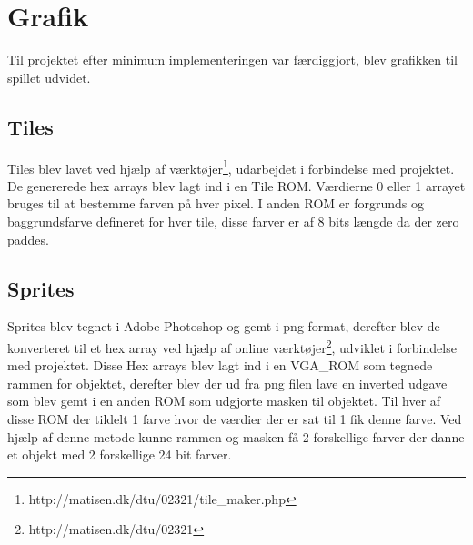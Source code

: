 \section{Grafik}
Til projektet efter minimum implementeringen var færdiggjort, blev grafikken til spillet udvidet. 


\subsection{Tiles}
Tiles blev lavet ved hjælp af værktøjer\footnote{http://matisen.dk/dtu/02321/tile\_maker.php}, udarbejdet i forbindelse med projektet. De genererede hex arrays blev lagt ind i en Tile ROM. Værdierne 0 eller 1 arrayet bruges til at bestemme farven på hver pixel. I anden ROM er forgrunds og baggrundsfarve defineret for hver tile, disse farver er af 8 bits længde da der zero paddes.

\subsection{Sprites}
Sprites blev tegnet i Adobe Photoshop og gemt i png format, derefter blev de konverteret til et hex array ved hjælp af online værktøjer\footnote{http://matisen.dk/dtu/02321}, udviklet i forbindelse med projektet. Disse Hex arrays blev lagt ind i en VGA\_ROM som tegnede rammen for objektet, derefter blev der ud fra png filen lave en inverted udgave som blev gemt i en anden ROM som udgjorte masken til objektet. Til hver af disse ROM der tildelt 1 farve hvor de værdier der er sat til 1 fik denne farve. Ved hjælp af denne metode kunne rammen og masken få 2 forskellige farver der danne et objekt med 2 forskellige 24 bit farver.